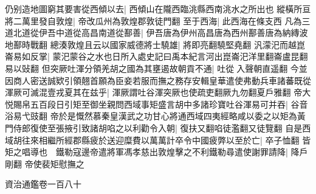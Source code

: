 仍别造地圖窮其要害從西傾以去|{
	西傾山在隴西臨洮縣西南洮水之所出也}
縱橫所亘將二萬里發自敦煌|{
	帝改瓜州為敦煌郡敦徒門翻}
至于西海|{
	此西海在條支西}
凡為三道北道從伊吾中道從高昌南道從鄯善|{
	伊吾唐為伊州高昌唐為西州鄯善唐為納縳波地鄯時戰翻}
總湊敦煌且云以國家威德將士驍雄|{
	將即亮翻驍堅堯翻}
汎濛汜而越崑崙易如反掌|{
	蒙汜蒙谷之水也日所入處史記曰禹本紀言河出崑崙汜洋里翻崙盧昆翻易以䜴翻}
但突厥吐渾分領羌胡之國為其壅遏故朝貢不通|{
	吐從入聲朝直遥翻}
今並因商人密送誠欵引領翹首願為臣妾若服而撫之務存安輯皇華遣使弗動兵車諸蕃既從渾厥可滅混壹戎夏其在兹乎|{
	渾厥謂吐谷渾突厥也使疏吏翻厥九勿翻夏戶雅翻}
帝大悦賜帛五百段日引矩至御坐親問西域事矩盛言胡中多諸珍寶吐谷渾易可并吞|{
	谷音浴易弋豉翻}
帝於是慨然慕秦皇漢武之功甘心將通西域四夷經略咸以委之以矩為黃門侍郎復使至張掖引致諸胡啗之以利勸令入朝|{
	復扶又翻啗徒濫翻又徒覽翻}
自是西域胡往來相繼所經郡縣疲於送迎糜費以萬萬計卒令中國疲弊以至於亡|{
	卒子恤翻}
皆矩之唱導也　鐵勒寇邊帝遣將軍馮孝慈出敦煌擊之不利鐵勒尋遣使謝罪請降|{
	降戶剛翻}
帝使裴矩慰撫之

資治通鑑卷一百八十
